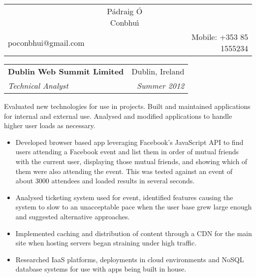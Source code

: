 \documentclass[11pt]{article}
\makeatletter
\newcommand{\resumeSection}[1]{
    \par
    \vspace{\baselineskip}
    \large {\sc {#1}}
    \par
    \vspace{-0.9\baselineskip}
    \hrulefill
    \vspace{0.5\baselineskip}
    \par
}
\newenvironment{resumeSubSectionHeader}{
    \par
    \begin{tabular*}{\textwidth}{l@{\extracolsep{\fill}}r}
    \par
} {
    \end{tabular*}
    \par
}
\newenvironment{resumeSubSectionBody}{
    \par
    \vspace{-0.8\parskip}
    \begin{small}
    \par
} {
    \par
    \end{small}
    \par
}
\makeatother
\begin{document}


%
%
\begin{center}
\begin{tabular*}{\textwidth}{@{\extracolsep{\fill}}lcr}

    &{ \huge \textbf \sc P\'{a}draig \'{O} Conbhu\'{\i} }&\\ %
    poconbhui@gmail.com & & Mobile: +353 85 1555234\\
    \hline\hline

\end{tabular*}
\end{center}




\resumeSection{Experience}


%
%
\begin{resumeSubSectionHeader}

    \textbf{Dublin Web Summit Limited} & Dublin, Ireland    \\
    \emph{Technical Analyst}           & \emph{Summer 2012}

\end{resumeSubSectionHeader}
\begin{resumeSubSectionBody}

    Evaluated new technologies for use in projects.
    Built and maintained applications for internal and external use.
    Analysed and modified applications to handle higher user loads
    as necessary.

    \begin{itemize}
        \item
            Developed browser based app leveraging Facebook's
            JavaScript API to find users attending a Facebook event
            and list them in order of mutual friends with the current user,
            displaying those mutual friends, and showing which of them
            were also attending the event.
            This was tested against an event of about 3000 attendees and
            loaded results in several seconds.

        \item
            Analysed ticketing system used for event, identified features
            causing the system to slow to an unacceptable pace when the
            user base grew large enough and suggested alternative
            approaches.

        \item
            Implemented caching and distribution of content through a CDN
            for the main site when hosting servers began straining under
            high traffic.

        \item
            Researched IaaS platforms, deployments in cloud environments
            and NoSQL database systems for use with apps being built in
            house.
    \end{itemize}

\end{resumeSubSectionBody}
\end{document}

